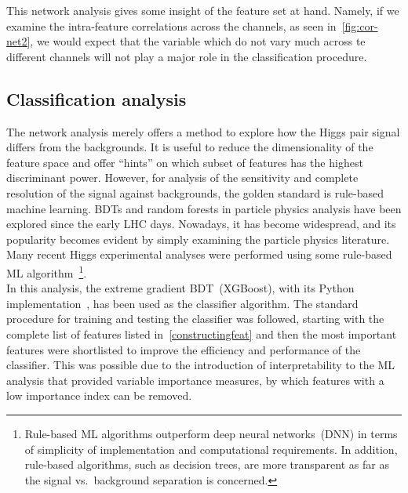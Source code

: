 This network analysis gives some insight of the feature set at hand. Namely, if we examine the intra-feature correlations across the channels, as seen in~\autoref{fig:cor-net2}, we would expect that the variable which do not vary much across te different channels will not play a major role in the classification procedure. 
\subsection{Classification analysis }
The network analysis merely offers a method to explore how the Higgs pair signal differs from the backgrounds. It is useful to reduce the dimensionality of the feature space and offer ``hints'' on which subset of features has the highest discriminant power. However, for analysis of the sensitivity and complete resolution of the signal against backgrounds, the golden standard is rule-based machine learning. 
BDTs and random forests in particle physics analysis have been explored since the early LHC days. Nowadays, it has become widespread, and its popularity becomes evident by simply examining the particle physics literature. Many recent Higgs experimental analyses were performed using some rule-based ML algorithm~\footnote{Rule-based ML algorithms outperform deep neural networks~(DNN) in terms of simplicity of implementation and computational requirements. In addition, rule-based algorithms, such as decision trees, are more transparent as far as the signal vs.~background separation is concerned.}.\\
In this analysis, the extreme gradient BDT~(XGBoost), with its Python implementation~\cite{10.1145/2939672.2939785}, has been used as the classifier algorithm. The standard procedure for training and testing the classifier was followed, starting with the complete list of features listed in~\autoref{constructingfeat} and then the most important features were shortlisted to improve the efficiency and performance of the classifier. This was possible due to the introduction of interpretability to the ML analysis that provided variable importance measures, by which features with a low importance index can be removed. \\
